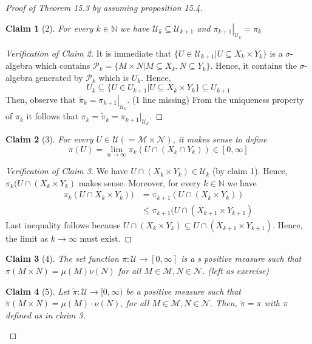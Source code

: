 \documentclass[letterpaper, 12pt]{article}
\newcommand{\cU}{\mathcal{U}}
\newcommand{\cM}{\mathcal{M}}
\newcommand{\cN}{\mathcal{N}}
\newcommand{\bN}{\mathbb{N}}
\newcommand{\cP}{\mathcal{P}}
\theoremstyle{stdthm}
\theoremstyle{stddef}
\theoremstyle{stdnonum}
\newtheorem{claim}{Claim}
\theoremstyle{stdqands}
\theoremstyle{stdbold}
\begin{document}
\begin{proof} [ Proof of Theorem 15.3 by assuming proposition 15.4]
\begin{claim}[2]
For every $k \in \bN$ we have $\cU_k \subseteq \cU_{k+1}$ and $\left. \pi_{k+1} \right|_{\cU_k} = \pi_k$
\end{claim}

\begin{proof} [Verification of Claim 2]
It is immediate that $\{U \in \cU_{k+1}|U \subseteq X_k \times Y_k\}$ is a $\sigma$-algebra which contains $\cP_k = \{M \times N| M\subseteq X_k, N \subseteq Y_k\}$. Hence, it contains the $\sigma$-algebra generated by $\cP_k$ which is $U_k$. Hence, 
\[ U_k \subseteq \{U \in U_{k+1}|U \subseteq X_k \times Y_k \} \subseteq U_{k+1} \]
Then, observe that $\left. \tilde{\pi}_k = \pi_{k+1} \right|_{\cU_k}$. (1 line missing) From the uniqueness property of $\pi_k$ it follows that $\pi_k = \tilde{\pi}_k = \pi_{k+1}|_{\cU_k}$.
\end{proof}

\begin{claim}[3]
For every $U \in \cU( = \cM \times \cN)$, it makes sense to define 
\[\pi(U) = \lim_{n\rightarrow \infty} \pi_k (U \cap (X_k \cap Y_k)) \in [0,\infty] \]
\end{claim}

\begin{proof}[Verification of Claim 3]
We have $U \cap (X_k \times Y_k) \in \cU_k$ (by claim 1). Hence, $\pi_k(U \cap (X_k \times Y_k)$ makes sense. Moreover, for every $k \in \bN$ we have 
\begin{align*}
\pi_k(U \cap X_k \times Y_k)) &= \pi_{k+1} (U \cap (X_k \times Y_k)) \tag{By Claim 2}\\
& \leq \pi_{k+1}(U \cap (X_{k+1} \times Y_{k+1})
\end{align*}
Last inequality follows because $U \cap (X_k \times Y_k) \subseteq U \cap (X_{k+1} \times Y_{k+1})$. Hence, the limit as $k\rightarrow \infty$ must exist.

\end{proof}

\begin{claim}[4]
The set function $\pi:\cU \rightarrow [0,\infty]$ is a s positive measure such that $\pi(M \times N) = \mu(M)\nu(N)$ for all $M \in \cM, N \in \cN$. (left as exercise)
\end{claim}

\begin{claim}[5]
Let $\tilde{\pi}: \cU \to [0,\infty)$ be a positive measure such that $\tilde{\pi}(M \times N) = \mu(M) \cdot \nu(N)$, for all $M \in \cM, N \in \cN$. Then, $\tilde{\pi} = \pi$ with $\pi$ defined as in claim 3. 
\end{claim}


\end{proof}
\end{document}
